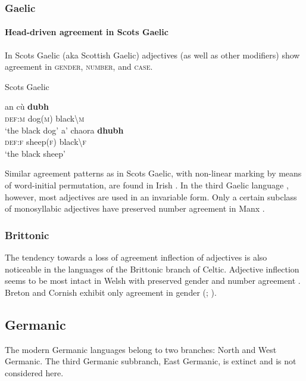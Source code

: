 \subsubsection{Gaelic}
\paragraph*{Head\hyp{}driven agreement in Scots Gaelic} 
In Scots Gaelic (aka Scottish Gaelic) adjectives (as well as other modifiers) show agreement in \textsc{gender, number}, and \textsc{case}.
\begin{exe}
\ex \rm{Scots Gaelic \citep[201]{macauley1992}}
\begin{xlist}
\ex
\gll	an cù \textbf{dubh}\\
	\textsc{def:m} dog(\textsc{m}) black\textbackslash\textsc{m}\\
\glt	‘the black dog’
\ex
\gll	a' chaora \textbf{dhubh}\\
	\textsc{def:f} sheep(\textsc{f}) black\textbackslash\textsc{f}\\
\glt	‘the black sheep’
\end{xlist}
\end{exe}
Similar agreement patterns as in Scots Gaelic, with non-linear marking by means of word-initial permutation, are found in Irish \cite[73, 97]{odochartaigh1992}. In the third Gaelic language , however, most adjectives are used in an invariable form. Only a certain subclass of monosyllabic adjectives have preserved number agreement in Manx \cite[127]{thomsen1992}.

\subsubsection{Brittonic}
The tendency towards a loss of agreement inflection of adjectives is also noticeable in the languages of the Brittonic branch of Celtic. Adjective inflection seems to be most intact in Welsh with preserved gender and number agreement \cite[298–299]{thomas1992a}. Breton and Cornish exhibit only agreement in gender (\citealt[405]{ternes1992}; \citealt[355]{thomas1992b}).

\subsection{Germanic}
The modern Germanic languages belong to two branches: North and West Germanic. The third Germanic subbranch, East Germanic, is extinct and is not considered here.

